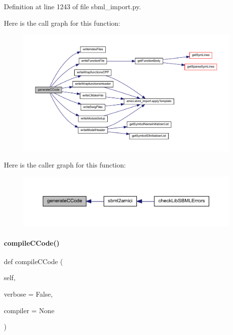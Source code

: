 Definition at line 1243 of file sbml\+\_\+import.\+py.

Here is the call graph for this function\+:
\nopagebreak
\begin{figure}[H]
\begin{center}
\leavevmode
\includegraphics[width=350pt]{classamici_1_1sbml__import_1_1_sbml_importer_ab36c229db61f3892cc5ae1b29d56940f_cgraph}
\end{center}
\end{figure}
Here is the caller graph for this function\+:
\nopagebreak
\begin{figure}[H]
\begin{center}
\leavevmode
\includegraphics[width=350pt]{classamici_1_1sbml__import_1_1_sbml_importer_ab36c229db61f3892cc5ae1b29d56940f_icgraph}
\end{center}
\end{figure}
\mbox{\label{classamici_1_1sbml__import_1_1_sbml_importer_ae3542bf042c5054d80091f219ef917f7}} 
\paragraph{\texorpdfstring{compile\+C\+Code()}{compileCCode()}}
{\footnotesize\ttfamily def compile\+C\+Code (\begin{DoxyParamCaption}\item[{}]{self,  }\item[{}]{verbose = {\ttfamily False},  }\item[{}]{compiler = {\ttfamily None} }\end{DoxyParamCaption})}


